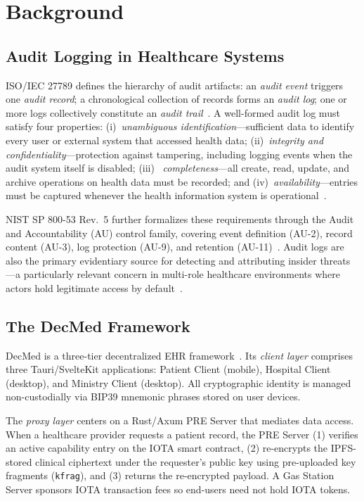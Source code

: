\section{Background}
\label{sec:background}

\subsection{Audit Logging in Healthcare Systems}

ISO/IEC 27789 defines the hierarchy of audit artifacts: an \emph{audit
event} triggers one \emph{audit record}; a chronological collection of
records forms an \emph{audit log}; one or more logs collectively constitute
an \emph{audit trail}~\cite{iso27789_2021}. A well-formed audit log must
satisfy four properties: (i)~\emph{unambiguous identification}---sufficient
data to identify every user or external system that accessed health data;
(ii)~\emph{integrity and confidentiality}---protection against tampering,
including logging events when the audit system itself is disabled; (iii)~%
\emph{completeness}---all create, read, update, and archive operations on
health data must be recorded; and (iv)~\emph{availability}---entries must
be captured whenever the health information system is
operational~\cite{iso27789_2021}.

NIST SP 800-53 Rev.\ 5 further formalizes these requirements through the
Audit and Accountability (AU) control family, covering event definition
(AU-2), record content (AU-3), log protection (AU-9), and retention
(AU-11)~\cite{nist80053r5}. Audit logs are also the primary evidentiary
source for detecting and attributing insider threats---a particularly
relevant concern in multi-role healthcare environments where actors hold
legitimate access by default~\cite{cert2022insiderthreat}.

\subsection{The DecMed Framework}

DecMed is a three-tier decentralized EHR framework~\cite{DecMed}. Its
\emph{client layer} comprises three Tauri/SvelteKit applications: Patient
Client (mobile), Hospital Client (desktop), and Ministry Client (desktop).
All cryptographic identity is managed non-custodially via BIP39 mnemonic
phrases stored on user devices.

The \emph{proxy layer} centers on a Rust/Axum PRE Server that mediates
data access. When a healthcare provider requests a patient record, the PRE
Server (1) verifies an active capability entry on the IOTA smart contract,
(2) re-encrypts the IPFS-stored clinical ciphertext under the requester's
public key using pre-uploaded key fragments (\texttt{kfrag}), and (3)
returns the re-encrypted payload. A Gas Station Server sponsors IOTA
transaction fees so end-users need not hold IOTA tokens.


